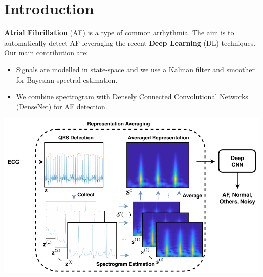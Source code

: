 \documentclass[portrait,a0,final]{a0poster} %
\newcommand{\bfcolor}[2]{\textcolor{#1}{\textbf{#2}}}
\begin{document}

\vspace{0.04\linewidth}

\centering



\small %


\begin{minipage}{0.98\linewidth}




\begin{minipage}[t]{0.47\linewidth}
\setlength{\parindent}{10mm} %


\section*{Introduction}
\Large
\bfcolor{aaltoFuchsia}{Atrial Fibrillation} (AF) is a type of common arrhythmia. The aim is to automatically detect AF leveraging the recent \bfcolor{aaltoBlue}{Deep Learning} (DL) techniques. Our main contribution are:
\vspace{4mm}
\begin{itemize}
	\item Signals are modelled in state-space and we use a Kalman filter and smoother for Bayesian spectral estimation.
	\item We combine spectrogram with Densely Connected Convolutional Networks (DenseNet) \cite{huang2017densely} for AF detection.
\end{itemize}
\vspace{4mm}
\begin{minipage}[c]{\linewidth}
	\centering
	\includegraphics[scale=2]{figures/pre-processing}
\end{minipage}



\end{minipage}
\end{minipage}
\end{document}
